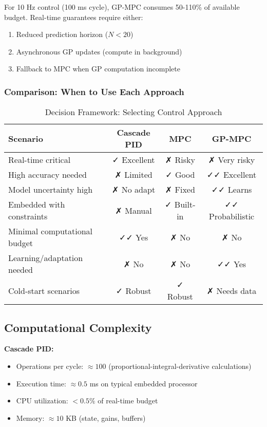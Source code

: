 \documentclass[journal]{IEEEtran}
\begin{document}
For 10 Hz control (100 ms cycle), GP-MPC consumes 50-110\% of available budget. Real-time guarantees require either:
\begin{enumerate}
    \item Reduced prediction horizon ($N < 20$)
    \item Asynchronous GP updates (compute in background)
    \item Fallback to MPC when GP computation incomplete
\end{enumerate}

\subsubsection{Comparison: When to Use Each Approach}

\begin{table}[htbp]
\centering
\caption{Decision Framework: Selecting Control Approach}
\begin{tabular}{|l|c|c|c|}
\hline
\textbf{Scenario} & \textbf{Cascade PID} & \textbf{MPC} & \textbf{GP-MPC} \\
\hline
Real-time critical & ✓ Excellent & ✗ Risky & ✗ Very risky \\
High accuracy needed & ✗ Limited & ✓ Good & ✓✓ Excellent \\
Model uncertainty high & ✗ No adapt & ✗ Fixed & ✓✓ Learns \\
Embedded with constraints & ✗ Manual & ✓ Built-in & ✓✓ Probabilistic \\
Minimal computational budget & ✓✓ Yes & ✗ No & ✗ No \\
Learning/adaptation needed & ✗ No & ✗ No & ✓✓ Yes \\
Cold-start scenarios & ✓ Robust & ✓ Robust & ✗ Needs data \\
\hline
\end{tabular}
\label{tab:decision_framework}
\end{table}

\subsection{Computational Complexity}

\textbf{Cascade PID:}
\begin{itemize}
    \item Operations per cycle: $\approx 100$ (proportional-integral-derivative calculations)
    \item Execution time: $\approx 0.5$ ms on typical embedded processor
    \item CPU utilization: $<0.5\%$ of real-time budget
    \item Memory: $\approx 10$ KB (state, gains, buffers)
\end{itemize}
\end{document}

